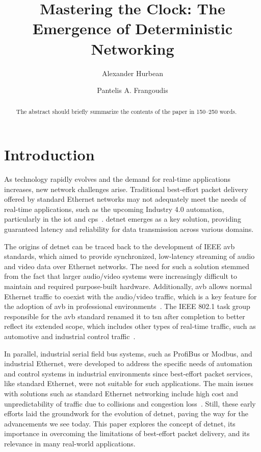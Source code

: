 \documentclass[runningheads]{llncs}
\begin{document}
\title{Mastering the Clock: The Emergence of Deterministic Networking}
\author{Alexander Hurbean \and
  Pantelis A. Frangoudis}

\maketitle              %

\begin{abstract}
  The abstract should briefly summarize the contents of the paper in
  150--250 words.
  
\end{abstract}

\section{Introduction}

As technology rapidly evolves and the demand for real-time applications increases, new network challenges arise. Traditional best-effort packet delivery offered by standard Ethernet networks may not adequately meet the needs of real-time applications, such as the upcoming Industry 4.0 automation, particularly in the \gls{iot} and \gls{cps}~\cite{Wollschlaeger2017}. \gls{detnet} emerges as a key solution, providing guaranteed latency and reliability for data transmission across various domains.

The origins of \gls{detnet} can be traced back to the development of IEEE \gls{avb} standards, which aimed to provide synchronized, low-latency streaming of audio and video data over Ethernet networks. The need for such a solution stemmed from the fact that larger audio/video systems were increasingly difficult to maintain and required purpose-built hardware. Additionally, \gls{avb} allows normal Ethernet traffic to coexist with the audio/video traffic, which is a key feature for the adoption of \gls{avb} in professional environments~\cite{Lim2012}. The IEEE 802.1 task group responsible for the \gls{avb} standard renamed it to \gls{tsn} after completion to better reflect its extended scope, which includes other types of real-time traffic, such as automotive and industrial control traffic~\cite{Wollschlaeger2017}.

In parallel, industrial serial field bus systems, such as ProfiBus or Modbus, and industrial Ethernet, were developed to address the specific needs of automation and control systems in industrial environments since best-effort packet services, like standard Ethernet, were not suitable for such applications. The main issues with solutions such as standard Ethernet networking include high cost and unpredictability of traffic due to collisions and congestion loss~\cite{Finn2018}. Still, these early efforts laid the groundwork for the evolution of \gls{detnet}, paving the way for the advancements we see today. This paper explores the concept of \gls{detnet}, its importance in overcoming the limitations of best-effort packet delivery, and its relevance in many real-world applications.
\end{document}
